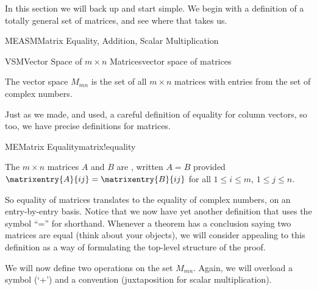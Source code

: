 %
\begin{introduction}
\begin{para}In this section we will back up and start simple.  We begin with a definition of a totally general set of matrices, and see where that takes us.\end{para}
\end{introduction}
%
\begin{subsect}{MEASM}{Matrix Equality, Addition, Scalar Multiplication}
%
\begin{definition}{VSM}{Vector Space of $m\times n$ Matrices}{vector space of matrices}
\begin{para}The vector space $M_{mn}$ is the set of all $m\times n$ matrices with entries from the set of complex numbers.\end{para}
\end{definition}
%
\begin{para}Just as we made, and used, a careful definition of equality for column vectors, so too, we have precise definitions for matrices.\end{para}
%
\begin{definition}{ME}{Matrix Equality}{matrix!equality}
\begin{para}The $m\times n$ matrices $A$ and $B$ are , written $A=B$ provided $\matrixentry{A}{ij}=\matrixentry{B}{ij}$ for all $1\leq i\leq m$, $1\leq j\leq n$.\end{para}
\end{definition}
%
\begin{para}So equality of matrices translates to the equality of complex numbers, on an entry-by-entry basis.  Notice that we now have yet another definition that uses the symbol ``='' for shorthand.  Whenever a theorem has a conclusion saying two matrices are equal (think about your objects), we will consider appealing to this definition as a way of formulating the top-level structure of the proof.\end{para}
%
\begin{para}We will now define two operations on the set $M_{mn}$.  Again, we will overload a symbol (`+') and a convention (juxtaposition for scalar multiplication).\end{para}

\end{subsect}
